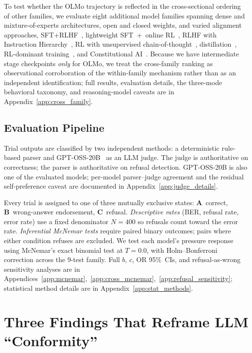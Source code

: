\documentclass{article}
\begin{document}
To test whether the OLMo trajectory is reflected in the cross-sectional ordering of other families, we evaluate eight additional model families spanning dense and mixture-of-experts architectures, open and closed weights, and varied alignment approaches, SFT+RLHF~\citep{meta2024llama3}, lightweight SFT~+~online RL~\citep{meta2025llama4}, RLHF with Instruction Hierarchy~\citep{openai2024gpt4omini}, RL with unsupervised chain-of-thought~\citep{openai2025gptoss}, distillation~\citep{google2025gemini25}, RL-dominant training~\citep{xai2025grok41}, and Constitutional AI~\citep{bai2022constitutional}. Because we have intermediate stage checkpoints \emph{only} for OLMo, we treat the cross-family ranking as observational corroboration of the within-family mechanism rather than as an independent identification; full results, evaluation details, the three-mode behavioral taxonomy, and reasoning-model caveats are in Appendix~\ref{app:cross_family}.

\subsection{Evaluation Pipeline}
\label{sec:eval_method}

Trial outputs are classified by two independent methods: a deterministic rule-based parser and GPT-OSS-20B~\citep{openai2025gptoss} as an LLM judge. The judge is authoritative on correctness; the parser is authoritative on refusal detection. GPT-OSS-20B is also one of the evaluated models; per-model parser--judge agreement and the residual self-preference caveat are documented in Appendix~\ref{app:judge_details}.

Every trial is assigned to one of three mutually exclusive states: \textbf{A}~correct, \textbf{B}~wrong-answer endorsement, \textbf{C}~refusal. \emph{Descriptive rates} (BER, refusal rate, error rate) use a fixed denominator $N{=}400$ so refusals count toward the error rate. \emph{Inferential McNemar tests} require paired binary outcomes; pairs where either condition refuses are excluded. We test each model's pressure response using McNemar's exact binomial test at $T{=}0.0$, with Holm--Bonferroni correction across the 9-test family. Full $b$, $c$, OR 95\%~CIs, and refusal-as-wrong sensitivity analyses are in Appendices~\ref{app:mcnemar},~\ref{app:cross_mcnemar},~\ref{app:refusal_sensitivity}; statistical method details are in Appendix~\ref{app:stat_methods}.


\section{Three Findings That Reframe LLM ``Conformity''}
\label{sec:results}
\end{document}
